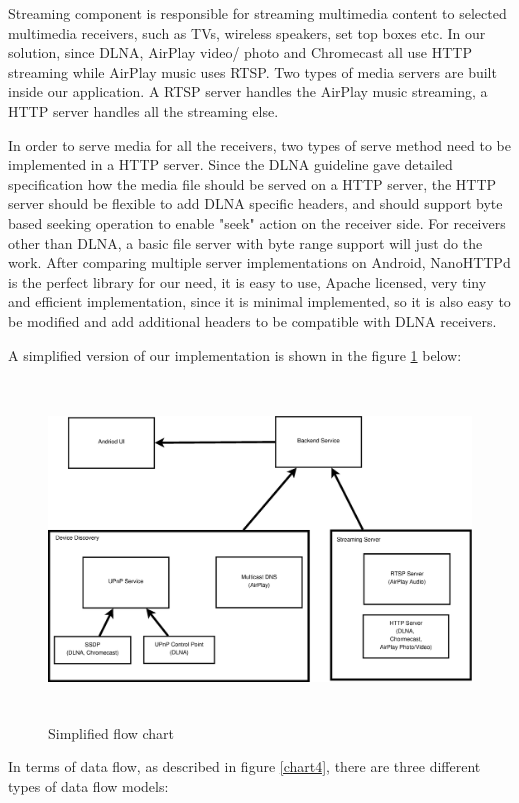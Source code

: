 Streaming component is responsible for streaming multimedia content to selected
multimedia receivers, such as TVs, wireless speakers, set top boxes etc. In our
solution, since DLNA, AirPlay video/ photo and Chromecast all use HTTP streaming
while AirPlay music uses RTSP. Two types of media servers are built inside our
application. A RTSP server handles the AirPlay music streaming, a HTTP server handles all the
streaming else.

In order to serve media for all the receivers, two types of serve method need to
be implemented in a HTTP server. Since the DLNA guideline gave detailed
specification how the media file should be served on a HTTP server, the HTTP server should be
flexible to add DLNA specific headers, and should support byte based seeking
operation to enable "seek" action on the receiver side. For receivers other than
DLNA, a basic file server with byte range support will just do the work. After
comparing multiple server implementations on Android, NanoHTTPd is the perfect
library for our need, it is easy to use, Apache licensed, very tiny and
efficient implementation, since it is minimal implemented, so it is also easy to
be modified and add additional headers to be compatible with DLNA receivers.


A simplified version of our implementation is shown in the figure \ref{chart3}
below:
\begin{figure}[htb]
\centering \includegraphics[height=9cm]{charts/chart3}
\caption{Simplified flow chart \label{chart3}}
\end{figure}

In terms of data flow, as described in figure \ref{chart4}, there are three
different types of data flow models: 

